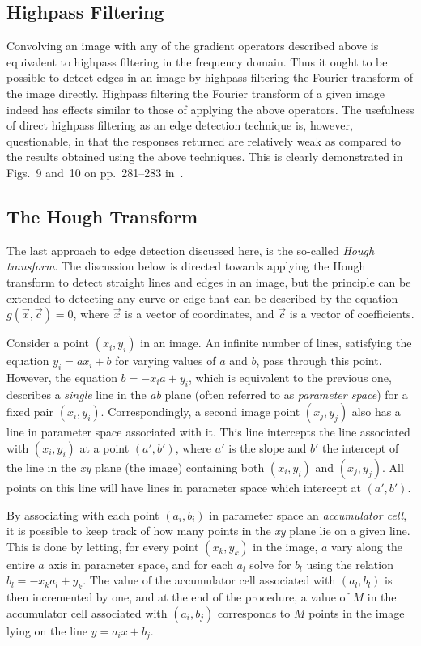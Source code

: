 \subsection{Highpass Filtering}
\label{image:edge:highpass}

Convolving an image with any of the gradient operators described above
is equivalent to highpass filtering in the frequency domain.  Thus it
ought to be possible to detect edges in an image by highpass filtering
the Fourier transform of the image directly.  Highpass filtering the
Fourier transform of a given image indeed has effects similar to those
of applying the above operators.  The usefulness of direct highpass
filtering as an edge detection technique is, however, questionable, in
that the responses returned are relatively weak as compared to the
results obtained using the above techniques.  This is clearly
demonstrated in Figs.~9 and~10 on pp.~281--283 in~\cite{digpic}.

\subsection{The Hough Transform}
\label{image:edge:hough}

The last approach to edge detection discussed here, is the so-called
{\em Hough transform\/}.  The discussion below is directed towards
applying the Hough transform to detect straight lines and edges in an
image, but the principle can be extended to detecting any curve or
edge that can be described by the equation $g(\vec{x},\vec{c})=0$,
where $\vec{x}$ is a vector of coordinates, and $\vec{c}$ is a vector
of coefficients.

Consider a point $(x_{i},y_{i})$ in an image.  An infinite number of
lines, satisfying the equation $y_{i}=ax_{i}+b$ for varying values of
$a$ and $b$, pass through this point.  However, the equation
$b=-x_{i}a+y_{i}$, which is equivalent to the previous one, describes
a {\em single\/} line in the {\it ab\/} plane (often referred to as
{\em parameter space\/}) for a fixed pair $(x_{i},y_{i})$.
Correspondingly, a second image point $(x_{j},y_{j})$ also has a line
in parameter space associated with it.  This line intercepts the line
associated with $(x_{i},y_{i})$ at a point $(a',b')$, where $a'$ is
the slope and $b'$ the intercept of the line in the {\it xy\/} plane
(the image) containing both $(x_{i},y_{i})$ and $(x_{j},y_{j})$.  All
points on this line will have lines in parameter space which intercept
at $(a',b')$.

By associating with each point $(a_{i},b_{i})$ in parameter space an
{\em accumulator cell\/}, it is possible to keep track of how many
points in the {\it xy\/} plane lie on a given line.  This is done by
letting, for every point $(x_{k},y_{k})$ in the image, $a$ vary along
the entire $a$ axis in parameter space, and for each $a_{l}$ solve for
$b_{l}$ using the relation $b_{l}=-x_{k}a_{l}+y_{k}$.  The value of
the accumulator cell associated with $(a_{l},b_{l})$ is then
incremented by one, and at the end of the procedure, a value of $M$ in
the accumulator cell associated with $(a_{i},b_{j})$ corresponds to
$M$ points in the image lying on the line $y=a_{i}x+b_{j}$.

